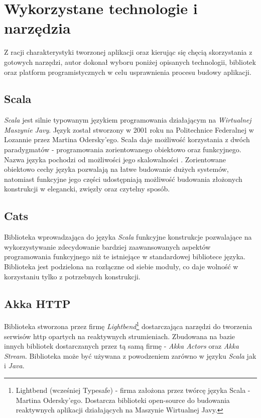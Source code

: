 \documentclass[../main.tex]{subfiles}
\begin{document}
\section{Wykorzystane technologie i narzędzia}
Z racji charakterystyki tworzonej aplikacji oraz kierując się chęcią skorzystania z gotowych narzędzi, autor dokonał wyboru poniżej opisanych technologii, bibliotek oraz platform programistycznych w celu usprawnienia procesu budowy aplikacji.

\subsection{Scala}
\textit{Scala} jest silnie typowanym językiem programowania działającym na \textit{Wirtualnej Maszynie Javy}. Język został stworzony w 2001 roku na Politechnice Federalnej w Lozannie przez Martina Odersky'ego. Scala daje możliwość korzystania z dwóch paradygmatów - programowania zorientowanego obiektowo oraz funkcyjnego. Nazwa języka pochodzi od możliwości jego skalowalności \cite{BOOK:ProgrammingInScala}. Zorientowane obiektowo cechy języka pozwalają na łatwe budowanie dużych systemów, natomiast funkcyjne jego części udostępniają możliwość budowania złożonych konstrukcji w elegancki, zwięzły oraz czytelny sposób.

\subsection{Cats}
Biblioteka wprowadzająca do języka \textit{Scala} funkcyjne konstrukcje pozwalające na wykorzystywanie zdecydowanie bardziej zaawansowanych aspektów programowania funkcyjnego niż te istniejące w standardowej bibliotece języka. Biblioteka jest podzielona na rozłączne od siebie moduły, co daje wolność w korzystaniu tylko z potrzebnych konstrukcji. \cite{WEBSITE:CatsDataTypes, BOOK:ScalaWithCats}

\subsection{Akka HTTP}
Biblioteka stworzona przez firmę \textit{Lightbend}\footnote{Lightbend (wcześniej Typesafe) - firma założona przez twórcę języka Scala - Martina Odersky'ego. Dostarcza biblioteki open-source do budowania reaktywnych aplikacji działających na Maszynie Wirtualnej Javy.} dostarczająca narzędzi do tworzenia serwisów http opartych na reaktywnych strumieniach. Zbudowana na bazie innych bibliotek dostarczanych przez tą samą firmę - \textit{Akka Actors} oraz \textit{Akka Stream}. Biblioteka może być używana z powodzeniem zarówno w języku \textit{Scala} jak i \textit{Java}.
\end{document}
